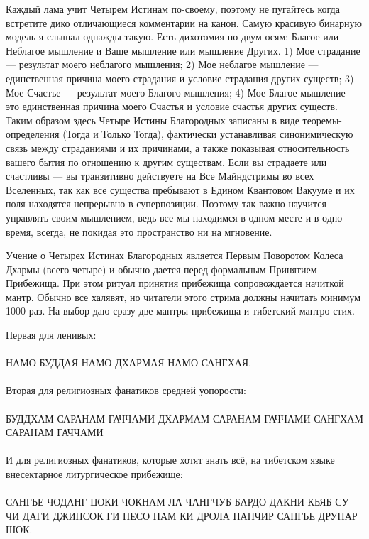 Каждый лама учит Четырем Истинам по-своему, поэтому не пугайтесь
когда встретите дико отличающиеся комментарии на канон. Самую
красивую бинарную модель я слышал однажды такую. Есть дихотомия
по двум осям: Благое или Неблагое мышление и Ваше мышление или
мышление Других. 1) Мое страдание — результат моего неблагого
мышления; 2) Мое неблагое мышление — единственная причина
моего страдания и условие страдания других существ; 3)
Мое Счастье — результат моего Благого мышления; 4) Мое
Благое мышление — это единственная причина моего Счастья
и условие счастья других существ. Таким образом здесь
Четыре Истины Благородных записаны в виде теоремы-определения
(Тогда и Только Тогда), фактически устанавливая синонимическую
связь между страданиями и их причинами, а также показывая
относительность вашего бытия по отношению к другим существам.
Если вы страдаете или счастливы — вы транзитивно действуете
на Все Майндстримы во всех Вселенных, так как все существа
пребывают в Едином Квантовом Вакууме и их поля находятся
непрерывно в суперпозиции. Поэтому так важно научится управлять
своим мышлением, ведь все мы находимся в одном месте и в одно
время, всегда, не покидая это пространство ни на мгновение.

Учение о Четырех Истинах Благородных является Первым Поворотом
Колеса Дхармы (всего четыре) и обычно дается перед формальным
Принятием Прибежища. При этом ритуал принятия прибежища
сопровождается начиткой мантр. Обычно все халявят, но читатели
этого стрима должны начитать минимум 1000 раз. На выбор даю
сразу две мантры прибежища и тибетский мантро-стих.

Первая для ленивых:
\\
\\
НАМО БУДДАЯ НАМО ДХАРМАЯ НАМО САНГХАЯ.
\\
\\
Вторая для религиозных фанатиков средней уопорости:
\\
\\
БУДДХАМ САРАНАМ ГАЧЧАМИ ДХАРМАМ САРАНАМ ГАЧЧАМИ САНГХАМ САРАНАМ ГАЧЧАМИ
\\
\\
И для религиозных фанатиков, которые хотят знать всё,
на тибетском языке внесектарное литургическое прибежище:
\\
\\
САНГЬЕ ЧОДАНГ ЦОКИ ЧОКНАМ ЛА ЧАНГЧУБ БАРДО ДАКНИ
КЬЯБ СУ ЧИ ДАГИ ДЖИНСОК ГИ ПЕСО НАМ КИ ДРОЛА ПАНЧИР
САНГЬЕ ДРУПАР ШОК.
